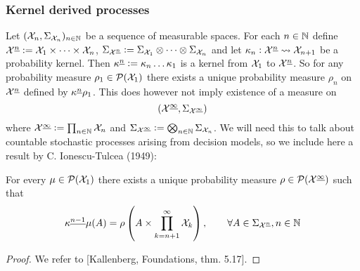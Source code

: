 \subsubsection{Kernel derived processes}

Let $(\mathcal{X}_n, \Sigma_{\mathcal{X}_n})_{n \in \mathbb{N}}$ be a sequence
of measurable spaces. For each $n \in \mathbb{N}$ define
$\mathcal{X}^{\underline{n}} \vcentcolon= \mathcal{X}_1 \times \dots \times \mathcal{X}_n$,
$\Sigma_{\mathcal{X}^{\underline{n}}} \vcentcolon= \Sigma_{\mathcal{X}_1} \otimes
\dots \otimes \Sigma_{\mathcal{X}_n}$
and let
$\kappa_n : \mathcal{X}^{\underline{n}} \leadsto \mathcal{X}_{n+1}$ be a probability kernel.
Then $\kappa^{\underline{n}} \vcentcolon= \kappa_n \dots \kappa_1$ is a kernel
from $\mathcal{X}_1$ to $\mathcal{X}^{\underline{n}}$.
So for any probability measure $\rho_1 \in \mathcal{P}(\mathcal{X}_1)$
there exists a unique probability measure 
$\rho_n$ on $\mathcal{X}^{\underline{n}}$ defined by
$\kappa^{\underline{n}} \rho_1$.
This does however not imply existence of a measure on
\[ \left(\mathcal{X}^{\underline{\infty}},
  \Sigma_{\mathcal{X}^{\underline{\infty}}} \right) \]
where $\mathcal{X}^{\underline{\infty}} \vcentcolon= \prod_{n \in \mathbb{N}} \mathcal{X}_n$ and
$\Sigma_{\mathcal{X}^{\underline{\infty}}} \vcentcolon= \bigotimes_{n \in \mathbb{N}}
\Sigma_{\mathcal{X}_n} $.
We will need this to talk about countable stochastic processes
arising from decision models, so we include here a result
by C. Ionescu-Tulcea (1949):

\begin{thm}
  For every $\mu \in \mathcal{P}(\mathcal{X}_1)$ 
  there exists a unique probability measure
  $\rho \in \mathcal{P}(\mathcal{X}^{\underline{\infty}})$ such that
  \[ \kappa^{\underline{n-1}} \mu (A) = \rho
    \left( A \times \prod_{k=n+1}^\infty \mathcal{X}_k \right)
  , \qquad \forall A \in \Sigma_{\mathcal{X}^{\underline{n}}}, n \in \mathbb{N} \]
  \label{thm:ionescuTulcea}
\end{thm}
\begin{proof}
  We refer to [Kallenberg, Foundations, thm. 5.17]. %
\end{proof}

